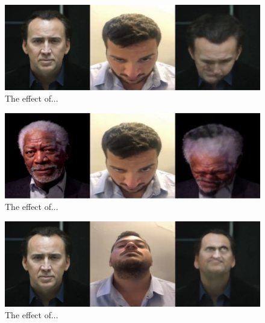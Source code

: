 \documentclass[english,12pt]{article}
\begin{document}
\begin{figure}[htb]
  \begin{centering}
      \includegraphics[scale=0.29]{images/‏‏Amit_tilt1_cage.PNG}
  \par\end{centering}
  \caption{\label{fig:Amit_tilt1_cage}The effect of...}
\end{figure}

\begin{figure}[htb]
  \begin{centering}
      \includegraphics[scale=0.29]{images/‏‏Amit_tilt1_freeman.PNG}
  \par\end{centering}
  \caption{\label{fig:Amit_tilt1_freeman}The effect of...}
\end{figure}

\begin{figure}[htb]
  \begin{centering}
      \includegraphics[scale=0.29]{images/‏‏Amit_tilt_cage.PNG}
  \par\end{centering}
  \caption{\label{fig:Amit_tilt_cage}The effect of...}
\end{figure}
\end{document}
